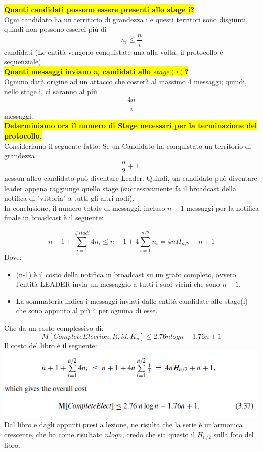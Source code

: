 \colorbox{yellow}{\textbf{Quanti candidati possono essere presenti allo stage
        i?}}\\
Ogni candidato ha un territorio di grandezza i e questi territori sono
disgiunti, quindi non possono esserci più di $$n_i \leq \frac{n}{i}$$ candidati
(Le entità vengono conquistate una alla volta, il protocollo è sequenziale). \\

\colorbox{yellow}{\textbf{Quanti messaggi inviano $n_i$ candidati allo
        $stage(i)$?}}\\
Ognuno darà origine ad un attacco che costerà al massimo 4 messaggi; quindi,
nello stage i, ci saranno al più $$\frac{4n}{i}$$ messaggi. \\

\colorbox{yellow}{\textbf{Determiniamo ora il numero di Stage necessari per la
        terminazione del protocollo.}} \\
Consideriamo il seguente fatto: Se un Candidato ha conquistato un territorio di
grandezza $$\frac{n}{2} +1,$$ nessun altro candidato può diventare Leader.
Quindi, un candidato può diventare leader appena raggiunge quello stage
(successivamente fa il broadcast della notifica di "vittoria" a tutti gli altri
nodi).\\

In conclusione, il numero totale di messaggi, incluso $n-1$ messaggi per la
notifica finale in broadcast è il seguente:

$$ n-1 + \sum_{i=1}^{\#stadi} 4 n_i \leq n-1 + 4 \sum_{i=1}^{n/2} n_i = 4 n
    H_{n/2} + n + 1$$ Dove:
\begin{itemize}
    \item (n-1) è il costo della notifica in broadcast su un grafo completo,
          ovvero l'entità LEADER invia un messaggio a tutti i suoi vicini che sono
          $n-1$.
    \item La sommatoria indica i messaggi inviati dalle entità candidate allo
          stage(i) che sono appunto al più 4 per ognuna di esse.

\end{itemize}

Che da un costo complessivo di:
$$M[CompleteElection, R, id, K_n] \leq 2.76 n log n - 1.76 n + 1$$ Il costo del
libro è il seguente:\\
\includegraphics[]{images/fff.png}
Dal libro e dagli appunti presi a lezione, ne risulta che la serie è un'armonica
crescente, che ha come risultato $nlogn$, credo che sia questo il $H_{n/2}$
sulla foto del libro.\\

